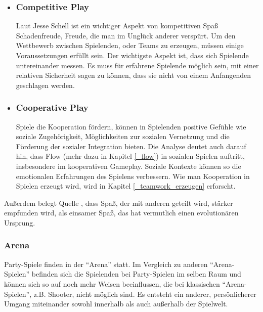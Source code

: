\begin{itemize}
\item\subsubsection{Competitive Play}
Laut Jesse Schell ist ein wichtiger Aspekt von kompetitiven Spaß Schadenfreude, Freude, die man im Unglück anderer verspürt\cite[S. 196]{_art_of_gamedesign}.
Um den Wettbewerb zwischen Spielenden, oder Teams zu erzeugen, müssen einige Voraussetzungen erfüllt sein. Der wichtigste Aspekt ist, dass sich Spielende untereinander messen. Es muss für erfahrene Spielende möglich sein, mit einer relativen Sicherheit sagen zu können, dass sie nicht von einem Anfangenden geschlagen werden\Cite[S. 311]{_art_of_gamedesign}.

\item\subsubsection{Cooperative Play\label{_cooperative_play}}
Spiele die Kooperation fördern, können in Spielenden positive Gefühle wie soziale Zugehörigkeit, Möglichkeiten zur sozialen Vernetzung und die Förderung der sozialer Integration bieten\cite{_putting_the_fun_factor_into_gaming}. Die Analyse deutet auch darauf hin, dass Flow (mehr dazu in Kapitel \ref{_flow}) in sozialen Spielen auftritt, insbesondere im kooperativen Gameplay\cite{_putting_the_fun_factor_into_gaming}. Soziale Kontexte können so die emotionalen Erfahrungen des Spielens verbessern. Wie man Kooperation in Spielen erzeugt wird, wird in Kapitel \ref{_teamwork_erzeugen} erforscht.
\end{itemize}

Außerdem belegt Quelle \cite{_fun_is_more_fun}, dass Spaß, der mit anderen geteilt wird, stärker empfunden wird, als einsamer Spaß, das hat vermutlich einen evolutionären Ursprung.

\subsubsection{Arena}
Party-Spiele finden in der "`Arena"' statt\cite[S. 65]{_art_of_gamedesign}. Im Vergleich zu anderen "`Arena-Spielen"' befinden sich die Spielenden bei Party-Spielen im selben Raum und können sich so auf noch mehr Weisen beeinflussen, die bei klassischen "`Arena-Spielen"', z.B. Shooter, nicht möglich sind. Es entsteht ein anderer, persönlicherer Umgang miteinander sowohl innerhalb als auch außerhalb der Spielwelt.

